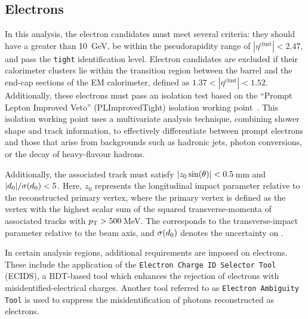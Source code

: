 %
%
\subsection{Electrons}
\label{sec:ChaptH:ObjectDefReco:electron}

In this analysis, the electron candidates must meet several criteria: 
they should have a \pT greater than 10~GeV, be within the pseudorapidity range of $|\eta^\mathrm{clust}| < 2.47$, 
and pass the \texttt{tight} identification level.  
Electron candidates are excluded if their calorimeter clusters lie within the transition region 
between the barrel and the end-cap sections of the EM calorimeter, defined as 
$1.37 < |\eta^\mathrm{clust}| < 1.52$. 
Additionally, these electrons must pass an isolation test based on the ``Prompt Lepton Improved Veto'' 
(PLImprovedTight) isolation working point~\cite{ATLAS:2022swp}.
 This isolation working point uses a multivariate analysis technique, combining shower shape and 
 track information, to effectively differentiate between prompt electrons and those that arise from 
 backgrounds such as hadronic jets, photon conversions, or the decay of heavy-flavour hadrons.

Additionally, the associated track must satisfy  $|z_{0} \sin(\theta)| < 0.5\,$mm 
and $|d_{0}| / \sigma(d_{0}) < 5$. Here, $z_{0}$ represents the longitudinal impact 
parameter relative to the reconstructed primary vertex, where the primary vertex is 
defined as the vertex with the highest scalar sum of the squared transverse-momenta 
of associated tracks with $p_{\text{T}} > 500\,$MeV. The \dzero corresponds to the transverse-impact 
parameter relative to the beam axis, and $\sigma(d_{0})$ denotes the uncertainty on \dzero.

In certain analysis regions, additional requirements are imposed on electrons. 
These include the application of 
the \texttt{Electron Charge ID Selector Tool} (ECIDS),
a BDT-based tool which enhances the rejection of electrons 
with misidentified-electrical charges. Another tool referred to as
\texttt{Electron Ambiguity Tool} is used to suppress the misidentification of 
photons reconstructed as electrons.

